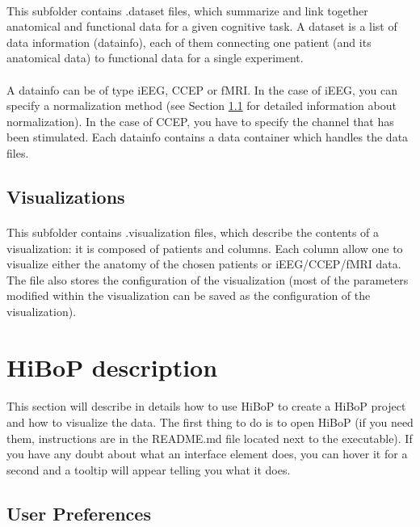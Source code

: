 \documentclass[a4paper]{article}
\begin{document}
\paragraph{} This subfolder contains .dataset files, which summarize and link together anatomical and functional data for a given cognitive task.
A dataset is a list of data information (datainfo), each of them connecting one patient (and its anatomical data) to functional data for a single experiment.
\paragraph{} A datainfo can be of type iEEG, CCEP or fMRI. In the case of iEEG, you can specify a normalization method (see Section \ref{preferences} for detailed information about normalization). In the case of CCEP, you have to specify the channel that has been stimulated. Each datainfo contains a data container which handles the data files.
\subsection{Visualizations}
\paragraph{} This subfolder contains .visualization files, which describe the contents of a visualization: it is composed of patients and columns. Each column allow one to visualize either the anatomy of the chosen patients or iEEG/CCEP/fMRI data. The file also stores the configuration of the visualization (most of the parameters modified within the visualization can be saved as the configuration of the visualization).
\section{HiBoP description}\label{UI}
\paragraph{} This section will describe in details how to use HiBoP to create a HiBoP project and how to visualize the data. The first thing to do is to open HiBoP (if you need them, instructions are in the README.md file located next to the executable). If you have any doubt about what an interface element does, you can hover it for a second and a tooltip will appear telling you what it does.
\subsection{User Preferences}\label{preferences}
\end{document}
